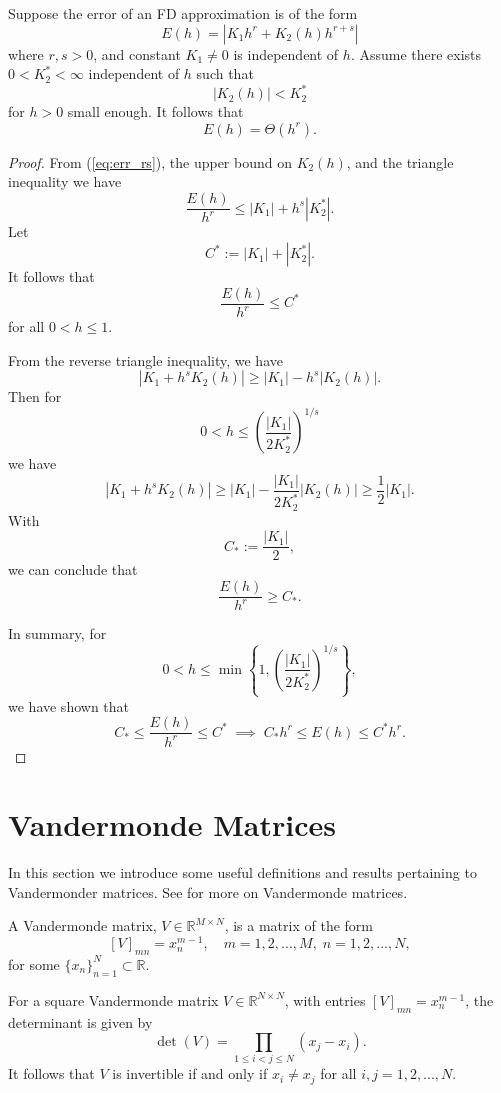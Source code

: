 \documentclass[12pt]{article}
\newcommand{\R}{\mathbb{R}}
\begin{document}
%
\begin{lemma}\label{lem:BigTheta2}
Suppose the error of an FD approximation is of the form
\begin{equation}\label{eq:err_rs}
	E(h) = |K_1h^r + K_2(h)h^{r+s}|
\end{equation}
where $r,s>0$, and constant $K_1\neq 0$ is independent of $h$.
Assume there exists $0< K_2^*<\infty$ independent of $h$ such that
\[
	|K_2(h)| < K_2^*
\]
for $h>0$ small enough.
It follows that 
\[
	E(h) = \Theta(h^r).
\]
\end{lemma}
%
\begin{proof}
From (\ref{eq:err_rs}), the upper bound on $K_2(h)$, and the triangle inequality we have
\[
	\frac{E(h)}{h^r} 
	\leq |K_1| + h^s|K_2^*|.
\]
Let 
\[
	C^* := |K_1| + |K_2^*|.
\]
It follows that 
\[
	\frac{E(h)}{h^r}  \leq C^*
\]
for all $0<h\le 1$.

From the reverse triangle inequality, we have
\[
	|K_1 + h^s K_2(h)| \geq |K_1| - h^s |K_2(h)|.
\]
Then for
\[
	0<h\le  \left(\frac{|K_1|}{2K_2^*}\right)^{1/s}
\]
we have
\[
	|K_1 + h^s K_2(h)| \geq |K_1| - \frac{|K_1|}{2K_2^*} |K_2(h)| \ge \frac{1}{2}|K_1|.
\]
With
\[
	C_* := \frac{|K_1|}{2},
\]
we can conclude that 
\[
	\frac{E(h)}{h^r} \geq C_*.
\]

In summary, for 
\[
	0< h \le \min\left\{ 1, \left(\frac{|K_1|}{2K_2^*}\right)^{1/s} \right\},
\]
we have shown that
\[
	C_* \le \frac{E(h)}{h^r} \le C^* \; \implies \; C_*h^r \le E(h) \le C^*h^r.
\]
\end{proof}


\section{Vandermonde Matrices}\label{app:Vander}

In this section we introduce some useful definitions and results pertaining to Vandermonder matrices.
See \cite{golub2013} for more on Vandermonde matrices.

%
\begin{definition}\label{eq:Vander}
A {Vandermonde matrix}, $V\in\R^{M\times N}$, is a matrix of the form
\[
	[V]_{mn} = x_n^{m-1}, \quad m=1,2,...,M, \; n=1,2,...,N,
\]
for some $\{x_n\}_{n=1}^{N}\subset\R$.
\end{definition}

%
\begin{lemma}
For a square Vandermonde matrix $V\in\R^{N\times N}$, with entries $[V]_{mn} = x_n^{m-1}$, the determinant is given by
\[
	\det(V) = \prod_{1\leq i < j\leq N}(x_j-x_i).
\]
It follows that $V$ is invertible if and only if $x_i\neq x_j$ for all $i,j=1,2,...,N$.
\end{lemma}
\end{document}
